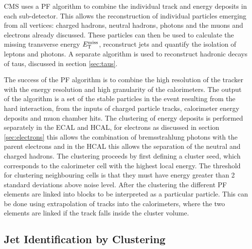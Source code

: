 CMS uses a \ac{PF} \cite{CMS-PAS-PFT-09-001,CMS-PAS-PFT-10-001,CMS-PAS-PFT-10-002} 
algorithm to combine the individual track and energy deposits in each sub-detector. 
This allows the reconstruction of individual particles emerging from all vertices: charged
hadrons, neutral hadrons, photons and the muons and electrons already discussed.
These particles can then be 
used to calculate the missing transverse energy $E_{\mathrm{T}}^{\text{miss}}$,
reconstruct jets and quantify the isolation of leptons and photons. A separate
algorithm is used to reconstruct hadronic decays of taus, discussed in section
\ref{sec:taus}. 

The success of the \ac{PF} algorithm is to combine the high resolution of
the tracker with the energy resolution and high granularity of the calorimeters.
The output of the algorithm is a set of the stable particles in the event
resulting from the hard interaction, from the inputs of charged particle tracks,
calorimeter energy deposits and muon chamber hits. The clustering of energy
deposits is performed separately in the \ac{ECAL} and \ac{HCAL}, for electrons
as discussed in section \ref{sec:electrons} this allows the combination of
bremsstrahlung photons with the parent electrons and in the \ac{HCAL} this
allows the separation of the neutral and charged hadrons. The clustering
proceeds by first defining a cluster seed, which corresponds to the calorimeter
cell with the highest local energy. The threshold for clustering neighbouring
cells is that they must have energy greater than 2 standard deviations above
noise level. After the clustering the different \ac{PF} elements are linked into
blocks to be interpreted as a particular particle. This can be done using
extrapolation of tracks into the calorimeters, where the two elements are linked
if the track falls inside the cluster volume.

\subsection{Jet Identification by Clustering}
\label{sec:jetID}

